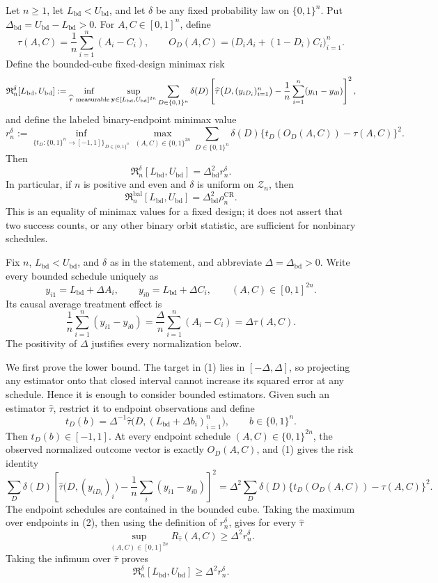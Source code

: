 Let \(n\geq 1\), let \(L_{\mathrm{bd}}<U_{\mathrm{bd}}\), and let \(\delta\) be any fixed probability law on \(\{0,1\}^n\).  Put \(\Delta_{\mathrm{bd}}=U_{\mathrm{bd}}-L_{\mathrm{bd}}>0\).  For \(A,C\in[0,1]^n\), define
\[
 \tau(A,C)=\frac1n\sum_{i=1}^n(A_i-C_i),
 \qquad O_D(A,C)=\bigl(D_iA_i+(1-D_i)C_i\bigr)_{i=1}^n.
\]
Define the bounded-cube fixed-design minimax risk
\[
 \mathfrak R_n^\delta[L_{\mathrm{bd}},U_{\mathrm{bd}}]
 :=\inf_{\widehat\tau\ {\rm measurable}}
 \sup_{\mathbf y\in[L_{\mathrm{bd}},U_{\mathrm{bd}}]^{2n}}
 \sum_{D\in\{0,1\}^n}\delta(D)
 \left[\widehat\tau\bigl(D,(y_{iD_i})_{i=1}^n\bigr)
 -\frac1n\sum_{i=1}^n(y_{i1}-y_{i0})\right]^2,
\]
and define the labeled binary-endpoint minimax value
\[
 r_n^\delta
 :=\inf_{\{t_D:\{0,1\}^n\to[-1,1]\}_{D\in\{0,1\}^n}}
 \max_{(A,C)\in\{0,1\}^{2n}}
 \sum_{D\in\{0,1\}^n}\delta(D)
 \{t_D(O_D(A,C))-\tau(A,C)\}^2.
\]
Then
\[
 \mathfrak R_n^\delta[L_{\mathrm{bd}},U_{\mathrm{bd}}]
 =\Delta_{\mathrm{bd}}^2 r_n^\delta.
\]
In particular, if \(n\) is positive and even and \(\delta\) is uniform on \(\mathcal Z_n\), then
\[
 \mathfrak R_n^{\mathrm{bal}}[L_{\mathrm{bd}},U_{\mathrm{bd}}]
 =\Delta_{\mathrm{bd}}^2\rho_n^{\mathrm{CR}}.
\]
This is an equality of minimax values for a fixed design; it does not assert that two success counts, or any other binary orbit statistic, are sufficient for nonbinary schedules.

Fix \(n\), \(L_{\mathrm{bd}}<U_{\mathrm{bd}}\), and \(\delta\) as in the statement, and abbreviate \(\Delta=\Delta_{\mathrm{bd}}>0\).  Write every bounded schedule uniquely as
\[
 y_{i1}=L_{\mathrm{bd}}+\Delta A_i,
 \qquad y_{i0}=L_{\mathrm{bd}}+\Delta C_i,
 \qquad (A,C)\in[0,1]^{2n}.
\]
Its causal average treatment effect is
\[
 \frac1n\sum_{i=1}^n(y_{i1}-y_{i0})
 =\frac{\Delta}{n}\sum_{i=1}^n(A_i-C_i)
 =\Delta\tau(A,C). \tag{1}
\]
The positivity of \(\Delta\) justifies every normalization below.

We first prove the lower bound.  The target in (1) lies in \([-\Delta,\Delta]\), so projecting any estimator onto that closed interval cannot increase its squared error at any schedule.  Hence it is enough to consider bounded estimators.  Given such an estimator \(\widehat\tau\), restrict it to endpoint observations and define
\[
 t_D(b)=\Delta^{-1}\widehat\tau
 \bigl(D,(L_{\mathrm{bd}}+\Delta b_i)_{i=1}^n\bigr),
 \qquad b\in\{0,1\}^n.
\]
Then \(t_D(b)\in[-1,1]\).  At every endpoint schedule \((A,C)\in\{0,1\}^{2n}\), the observed normalized outcome vector is exactly \(O_D(A,C)\), and (1) gives the risk identity
\[
 \sum_D\delta(D)
 \left[\widehat\tau\bigl(D,(y_{iD_i})_i\bigr)
       -\frac1n\sum_i(y_{i1}-y_{i0})\right]^2
 =\Delta^2\sum_D\delta(D)
 \{t_D(O_D(A,C))-\tau(A,C)\}^2. \tag{2}
\]
The endpoint schedules are contained in the bounded cube.  Taking the maximum over endpoints in (2), then using the definition of \(r_n^\delta\), gives for every \(\widehat\tau\)
\[
 \sup_{(A,C)\in[0,1]^{2n}}R_{\widehat\tau}(A,C)
 \geq \Delta^2 r_n^\delta.
\]
Taking the infimum over \(\widehat\tau\) proves
\[
 \mathfrak R_n^\delta[L_{\mathrm{bd}},U_{\mathrm{bd}}]
 \geq\Delta^2 r_n^\delta. \tag{3}
\]

